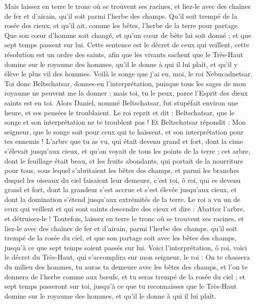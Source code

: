 \begin{multicols}{2}
Mais laissez en terre le tronc où se trouvent ses racines, et liez-le avec des chaînes de fer et d'airain, qu'il soit parmi l'herbe des champs.  Qu'il soit trempé de la rosée des cieux, et qu'il ait, comme les bêtes, l'herbe de la terre pour partage.
Que son cœur d’homme soit changé, et qu’un cœur de bête lui soit donné ; et que sept temps passent sur lui.
Cette sentence est le décret de ceux qui veillent, cette résolution est un ordre des saints, afin que les vivants sachent que le Très-Haut domine sur le royaume des hommes, qu'il le donne à qui il lui plaît, et qu’il y élève le plus vil des hommes.
Voilà le songe que j’ai eu, moi, le roi Nebucadnetsar. Toi donc Beltschatsar, donnes-en l’interprétation, puisque tous les sages de mon royaume ne peuvent me la donner ; mais toi, tu le peux, parce l'Esprit des dieux saints est en toi.
Alors Daniel, nommé Beltschatsar, fut stupéfait environ une heure, et ses pensées le troublaient. Le roi reprit et dit : Beltschatsar, que le songe et son interprétation ne te troublent pas ! Et Beltschatsar répondit : Mon seigneur, que le songe soit pour ceux qui te haïssent, et son interprétation pour tes ennemis !
L'arbre que tu as vu, qui était devenu grand et fort, dont la cime s’élevait jusqu’aux cieux, et qu’on voyait de tous les points de la terre ;
cet arbre, dont le feuillage était beau, et les fruits abondants, qui portait de la nourriture pour tous, sous lequel s’abritaient les bêtes des champs, et parmi les branches duquel les oiseaux du ciel faisaient leur demeure,
c’est toi, ô roi, qui es devenu grand et fort, dont la grandeur s'est accrue et s’est élevée jusqu'aux cieux, et dont la domination s’étend jusqu’aux extrémités de la terre.
Le roi a vu un de ceux qui veillent et qui sont saints descendre des cieux et dire : Abattez l'arbre, et détruisez-le ! Toutefois, laissez en terre le tronc où se trouvent ses racines, et liez-le avec des chaînes de fer et d'airain, parmi l'herbe des champs, qu'il soit trempé de la rosée du ciel, et que son partage soit avec les bêtes des champs, jusqu'à ce que sept temps soient passés sur lui.
Voici l'interprétation, ô roi, voici le décret du Très-Haut, qui s’accomplira sur mon seigneur, le roi :
On te chassera du milieu des hommes, tu auras ta demeure avec les bêtes des champs, et l’on te donnera de l'herbe comme aux bœufs, et tu seras trempé de la rosée du ciel ; et sept temps passeront sur toi, jusqu’à ce que tu reconnaisses que le Très-Haut domine sur le royaume des hommes, et qu'il le donne à qui il lui plaît.

\end{multicols}
